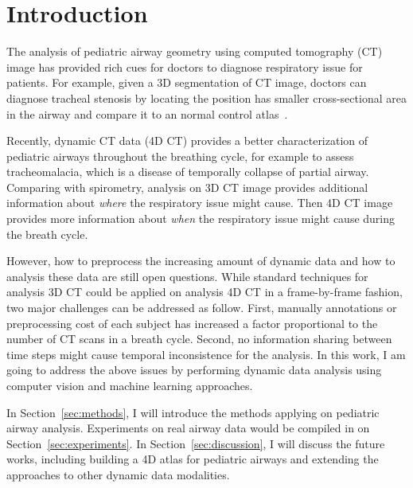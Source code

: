 \section{Introduction}
\label{sec:intro}

The analysis of pediatric airway geometry using computed tomography (CT) image has provided rich cues for doctors to diagnose respiratory issue for patients.
For example, given a 3D segmentation of CT image, doctors can diagnose tracheal stenosis by locating the position has smaller cross-sectional area in the airway and compare it to an normal control atlas~\cite{hong2014statistical}.

Recently, dynamic CT data (4D CT) provides a better characterization of pediatric airways throughout the breathing cycle, for example to assess tracheomalacia, which is a disease of temporally collapse of partial airway.
Comparing with spirometry, analysis on 3D CT image provides additional information about {\it where} the respiratory issue might cause.
Then 4D CT image provides more information about {\it when} the respiratory issue might cause during the breath cycle.

However, how to preprocess the increasing amount of dynamic data and how to analysis these data are still open questions.
While standard techniques for analysis 3D CT could be applied on analysis 4D CT in a frame-by-frame fashion, two major challenges can be addressed as follow.
First, manually annotations or preprocessing cost of each subject has increased a factor proportional to the number of CT scans in a breath cycle.
Second, no information sharing between time steps might cause temporal inconsistence for the analysis.
In this work, I am going to address the above issues by performing dynamic data analysis using computer vision and machine learning approaches.

In Section~\ref{sec:methods}, I will introduce the methods applying on pediatric airway analysis.
Experiments on real airway data would be compiled in on Section~\ref{sec:experiments}.
In Section~\ref{sec:discussion}, I will discuss the future works, including building a 4D atlas for pediatric airways and extending the approaches to other dynamic data modalities.